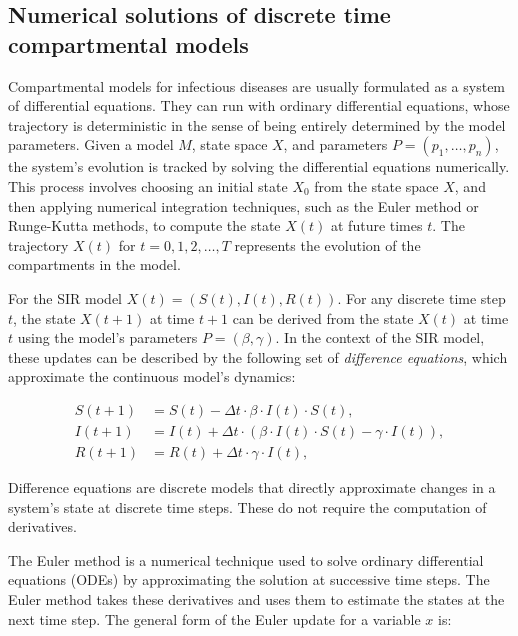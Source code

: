 \documentclass[
11pt, %
oneside, %
english, %
singlespacing, %
]{macthesis} %
\begin{document}
\subsection{Numerical solutions of discrete time compartmental models}\label{Numerical-solutions-of-discrete-time-compartmental-models}

Compartmental models for infectious diseases are usually formulated as a system of differential equations. They can run with ordinary differential equations, whose trajectory is deterministic in the sense of being entirely determined by the model parameters. Given a model \(M\), state space \(X\), and parameters \(P = (p_1, \dots, p_n)\), the system's evolution is tracked by solving the differential equations numerically. This process involves choosing an initial state \(X_0\) from the state space \(X\), and then applying numerical integration techniques, such as the Euler method or Runge-Kutta methods, to compute the state \(X(t)\) at future times \(t\). The trajectory \(X(t)\) for \(t = 0, 1, 2, \dots, T\) represents the evolution of the compartments in the model.

For the SIR model \(X(t) = (S(t), I(t), R(t))\). For any discrete time step \(t\), the state \(X(t+1)\) at time \(t+1\) can be derived from the state \(X(t)\) at time \(t\) using the model's parameters \(P = (\beta, \gamma)\). In the context of the SIR model, these updates can be described by the following set of \emph{difference equations}, which approximate the continuous model's dynamics:

\[
\begin{aligned}
S(t+1) & = S(t) - \Delta t \cdot \beta \cdot I(t) \cdot S(t), \\
I(t+1) & = I(t) + \Delta t \cdot (\beta \cdot I(t) \cdot S(t) - \gamma \cdot I(t)), \\
R(t+1) & = R(t) + \Delta t \cdot \gamma \cdot I(t),
\end{aligned}
\]

Difference equations are discrete models that directly approximate changes in a system's state at discrete time steps. These do not require the computation of derivatives.

The Euler method is a numerical technique used to solve ordinary differential equations (ODEs) by approximating the solution at successive time steps. The Euler method takes these derivatives and uses them to estimate the states at the next time step. The general form of the Euler update for a variable \(x\) is:
\end{document}
